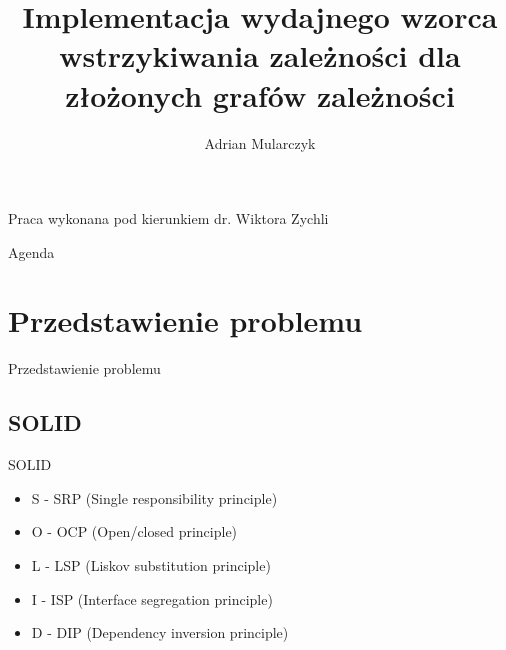 \documentclass{beamer}
\title[]
{Implementacja wydajnego wzorca wstrzykiwania zależności dla złożonych grafów zależności}
\author[Adrian Mularczyk]
{Adrian Mularczyk}
\institute[Uniwersytet Wrocławski]
{
Uniwersytet Wrocławski\\
Wydział Matematyki i Informatyki\\
Kierunek: Informatyka
}
\date{}
\begin{document}
\begin{frame}
  \titlepage
 
\begin{small}
\begin{flushright}
Praca wykonana pod kierunkiem dr. Wiktora Zychli
\end{flushright}
\end{small}
 
\end{frame}

\begin{frame}{Agenda}
  \tableofcontents
\end{frame}


\section{Przedstawienie problemu}

\begin{frame}{}
\begin{center}
\huge{Przedstawienie problemu}
\end{center}
\end{frame}

\subsection*{SOLID}

\begin{frame}{SOLID}
\begin{itemize}
	\item S - SRP (Single responsibility principle)
	\item O - OCP (Open/closed principle)
	\item L - LSP (Liskov substitution principle)
	\item I - ISP (Interface segregation principle)
	\item D - DIP (Dependency inversion principle)
\end{itemize}
\end{frame}
\end{document}
